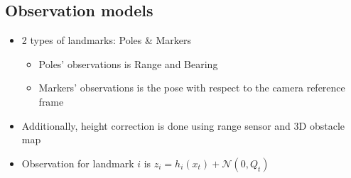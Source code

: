 \documentclass[serif,aspectratio=169]{beamer}
\begin{document}
    \subsection{Observation models}
    \begin{frame}
        \begin{itemize}
            \item{2 types of landmarks: Poles \& Markers
                \begin{itemize}
                    \item{Poles' observations is Range and Bearing}
                    \item{Markers' observations is the pose with respect to the camera reference frame}
                \end{itemize}
            }
            \item{Additionally, height correction is done using range sensor and 3D obstacle map}
            \item{Observation for landmark $i$ is $z_i = h_i\left(x_t\right) + \mathcal{N}\left(0, Q_t\right)$}

        \end{itemize}
    \end{frame}
\end{document}
